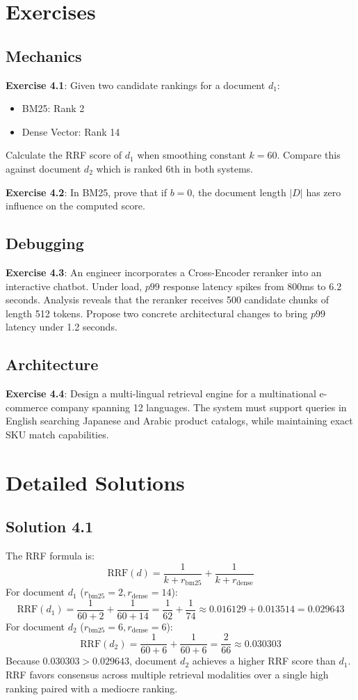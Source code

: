 \section{Exercises}

\subsection*{Mechanics}
\textbf{Exercise 4.1}: Given two candidate rankings for a document $d_1$:
\begin{itemize}
  \item BM25: Rank 2
  \item Dense Vector: Rank 14
\end{itemize}
Calculate the RRF score of $d_1$ when smoothing constant $k = 60$. Compare this against document $d_2$ which is ranked 6th in both systems.

\textbf{Exercise 4.2}: In BM25, prove that if $b = 0$, the document length $|D|$ has zero influence on the computed score.

\subsection*{Debugging}
\textbf{Exercise 4.3}: An engineer incorporates a Cross-Encoder reranker into an interactive chatbot. Under load, $p99$ response latency spikes from 800ms to 6.2 seconds. Analysis reveals that the reranker receives 500 candidate chunks of length 512 tokens. Propose two concrete architectural changes to bring $p99$ latency under 1.2 seconds.

\subsection*{Architecture}
\textbf{Exercise 4.4}: Design a multi-lingual retrieval engine for a multinational e-commerce company spanning 12 languages. The system must support queries in English searching Japanese and Arabic product catalogs, while maintaining exact SKU match capabilities.

\section{Detailed Solutions}

\subsection*{Solution 4.1}
The RRF formula is:
\[
\text{RRF}(d) = \frac{1}{k + r_{\text{bm25}}} + \frac{1}{k + r_{\text{dense}}}
\]
For document $d_1$ ($r_{\text{bm25}} = 2, r_{\text{dense}} = 14$):
\[
\text{RRF}(d_1) = \frac{1}{60 + 2} + \frac{1}{60 + 14} = \frac{1}{62} + \frac{1}{74} \approx 0.016129 + 0.013514 = 0.029643
\]
For document $d_2$ ($r_{\text{bm25}} = 6, r_{\text{dense}} = 6$):
\[
\text{RRF}(d_2) = \frac{1}{60 + 6} + \frac{1}{60 + 6} = \frac{2}{66} \approx 0.030303
\]
Because $0.030303 > 0.029643$, document $d_2$ achieves a higher RRF score than $d_1$. RRF favors consensus across multiple retrieval modalities over a single high ranking paired with a mediocre ranking.

